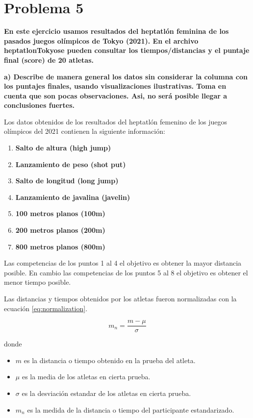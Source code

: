 \section*{Problema 5}

\textbf{En este ejercicio usamos resultados del heptatlón feminina de los pasados juegos olímpicos de Tokyo (2021). En el archivo heptatlonTokyose pueden consultar los tiempos/distancias y el puntaje final (score) de 20 atletas.}

\textbf{a) Describe de manera general los datos sin considerar la columna con los puntajes finales, usando visualizaciones ilustrativas. Toma en cuenta que son pocas observaciones. Asi, no será posible llegar a conclusiones fuertes.}

Los datos obtenidos de los resultados del heptatlón femenino de los juegos olímpicos del 2021 contienen la siguiente información:

\begin{enumerate}
    \item \textbf{Salto de altura (high jump)}
    \item \textbf{Lanzamiento de peso (shot put)}
    \item \textbf{Salto de longitud (long jump)}
    \item \textbf{Lanzamiento de javalina (javelin)}
    \item \textbf{100 metros planos (100m)}
    \item \textbf{200 metros planos (200m)}
    \item \textbf{800 metros planos (800m)}
\end{enumerate}

Las competencias de los puntos 1 al 4 el objetivo es obtener la mayor distancia posible. En cambio las competencias de los puntos 5 al 8 el objetivo es obtener el menor tiempo posible.

Las distancias y tiempos obtenidos por los atletas fueron normalizadas con la ecuación \ref{eq:normalization}.

\begin{equation}
    m_n = \frac{m - \mu}{\sigma} \label{eq:normalization}
\end{equation}

donde

\begin{itemize}
    \item $m$ es la distancia o tiempo obtenido en la prueba del atleta.
    \item $\mu$ es la media de los atletas en cierta prueba.
    \item $\sigma$ es la desviación estandar de los atletas en cierta prueba.
    \item $m_n$ es la medida de la distancia o tiempo del participante estandarizado.
\end{itemize}

